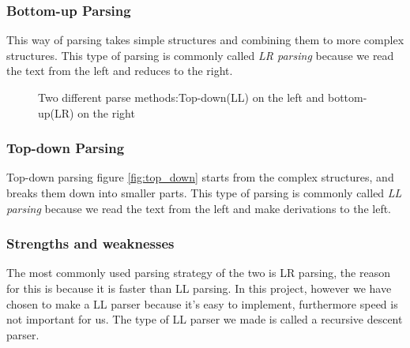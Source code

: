 		\subsubsection*{Bottom-up Parsing}
			This way of parsing takes simple structures and combining them to more complex structures.
			This type of parsing is commonly called {\it LR parsing} because we read the text from the left and reduces to the right.
			\begin{figure}[H]
				\centering
				\caption{Two different parse methods:Top-down(LL) on the left and bottom-up(LR) on the right}\label{fig:parsers}
			\end{figure}
			
		\subsubsection*{Top-down Parsing}
			Top-down parsing figure \ref{fig:top_down} starts from the complex structures, and breaks them down into smaller parts.
			This type of parsing is commonly called {\it LL parsing} because we read the text from the left and make derivations to the left.
		
		\subsubsection*{Strengths and weaknesses}
			The most commonly used parsing strategy of the two is LR parsing, the reason for this is because it is faster than LL parsing.
			In this project, however we have chosen to make a LL parser because it's easy to implement, furthermore speed is not important for us. 
			The type of LL parser we made is called a recursive descent parser.
			
